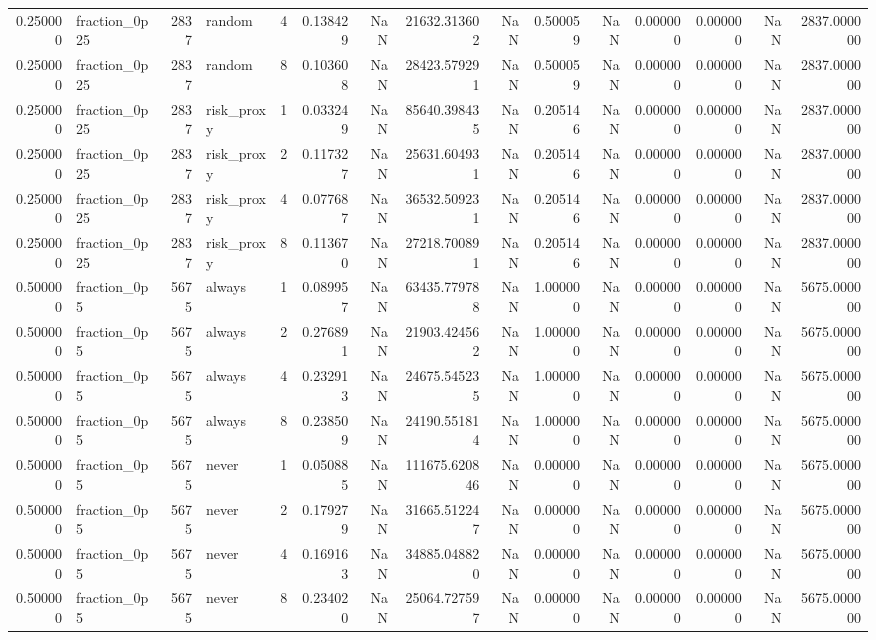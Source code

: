 \begin{tabular}{rlrlrrrrrrrrrrr}
0.250000 & fraction\_0p25 & 2837 & random & 4 & 0.138429 & NaN & 21632.313602 & NaN & 0.500059 & NaN & 0.000000 & 0.000000 & NaN & 2837.000000 \\
0.250000 & fraction\_0p25 & 2837 & random & 8 & 0.103608 & NaN & 28423.579291 & NaN & 0.500059 & NaN & 0.000000 & 0.000000 & NaN & 2837.000000 \\
0.250000 & fraction\_0p25 & 2837 & risk\_proxy & 1 & 0.033249 & NaN & 85640.398435 & NaN & 0.205146 & NaN & 0.000000 & 0.000000 & NaN & 2837.000000 \\
0.250000 & fraction\_0p25 & 2837 & risk\_proxy & 2 & 0.117327 & NaN & 25631.604931 & NaN & 0.205146 & NaN & 0.000000 & 0.000000 & NaN & 2837.000000 \\
0.250000 & fraction\_0p25 & 2837 & risk\_proxy & 4 & 0.077687 & NaN & 36532.509231 & NaN & 0.205146 & NaN & 0.000000 & 0.000000 & NaN & 2837.000000 \\
0.250000 & fraction\_0p25 & 2837 & risk\_proxy & 8 & 0.113670 & NaN & 27218.700891 & NaN & 0.205146 & NaN & 0.000000 & 0.000000 & NaN & 2837.000000 \\
0.500000 & fraction\_0p5 & 5675 & always & 1 & 0.089957 & NaN & 63435.779788 & NaN & 1.000000 & NaN & 0.000000 & 0.000000 & NaN & 5675.000000 \\
0.500000 & fraction\_0p5 & 5675 & always & 2 & 0.276891 & NaN & 21903.424562 & NaN & 1.000000 & NaN & 0.000000 & 0.000000 & NaN & 5675.000000 \\
0.500000 & fraction\_0p5 & 5675 & always & 4 & 0.232913 & NaN & 24675.545235 & NaN & 1.000000 & NaN & 0.000000 & 0.000000 & NaN & 5675.000000 \\
0.500000 & fraction\_0p5 & 5675 & always & 8 & 0.238509 & NaN & 24190.551814 & NaN & 1.000000 & NaN & 0.000000 & 0.000000 & NaN & 5675.000000 \\
0.500000 & fraction\_0p5 & 5675 & never & 1 & 0.050885 & NaN & 111675.620846 & NaN & 0.000000 & NaN & 0.000000 & 0.000000 & NaN & 5675.000000 \\
0.500000 & fraction\_0p5 & 5675 & never & 2 & 0.179279 & NaN & 31665.512247 & NaN & 0.000000 & NaN & 0.000000 & 0.000000 & NaN & 5675.000000 \\
0.500000 & fraction\_0p5 & 5675 & never & 4 & 0.169163 & NaN & 34885.048820 & NaN & 0.000000 & NaN & 0.000000 & 0.000000 & NaN & 5675.000000 \\
0.500000 & fraction\_0p5 & 5675 & never & 8 & 0.234020 & NaN & 25064.727597 & NaN & 0.000000 & NaN & 0.000000 & 0.000000 & NaN & 5675.000000 \\

\end{tabular}
